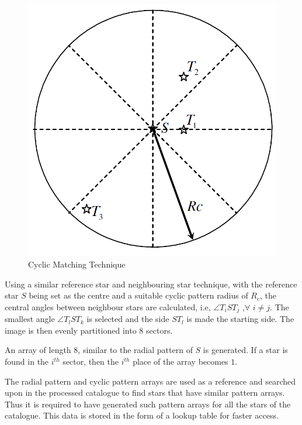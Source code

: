 \begin{itemize}
    \begin{figure}[!h]
        \centering
        \includegraphics[scale=0.35]{Figures/GNC/cyclic_technique.PNG}
        \caption{Cyclic Matching Technique}
        \label{fig:cyclic}
    \end{figure}
    
    Using a similar reference star and neighbouring star technique, with the reference star $S$ being set as the centre and a suitable cyclic pattern radius of $R_c$, the central angles between neighbour stars are calculated, i.e, $\angle T_i S T_j$ ,$\forall$ $i\neq j$. The smallest angle $\angle T_l S T_k$ is selected and the side $ST_l$ is made the starting side. The image is then evenly partitioned into $8$ sectors. 
    
    An array of length $8$, similar to the radial pattern of $S$ is generated. If a star is found in the $i^{th}$ sector, then the $i^{th}$ place of the array becomes $1$.

\end{itemize}

The radial pattern and cyclic pattern arrays are used as a reference and searched upon in the processed catalogue to find stars that have similar pattern arrays. Thus it is required to have generated such pattern arrays for all the stars of the catalogue. This data is stored in the form of a lookup table for faster access.

